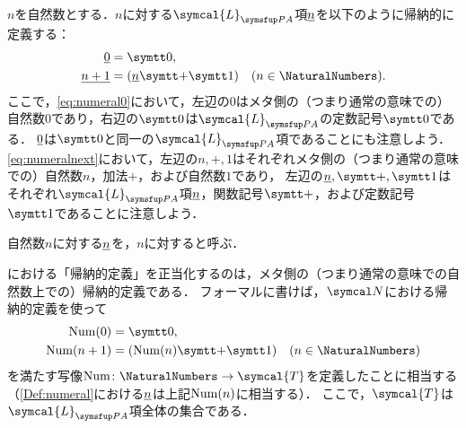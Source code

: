 \begin{Def} \label{Def:numeral}
	\(n\)を自然数とする．\(n\)に対する\(\symcal{L}_{\PA}\)項\(\underline{n}\)を以下のように帰納的に定義する：
	\begin{align}
		\numeral{0}     & = \obj{0},
		\label{eq:numeral0}                                                                    \\
		\numeral{n + 1} & = \paren{\numeral{n} \obj{+} \obj{1}} \quad (n \in \NaturalNumbers).
		\label{eq:numeralnext}
	\end{align}
	ここで，\cref{eq:numeral0}において，左辺の\(0\)はメタ側の（つまり通常の意味での）自然数\(0\)であり，右辺の\(\obj{0}\)は\(\symcal{L}_{\PA}\)の定数記号\(\obj{0}\)である．
	\(\underline{0}\)は\(\obj{0}\)と同一の\(\symcal{L}_{\PA}\)項であることにも注意しよう．
	\cref{eq:numeralnext}において，左辺の\(n, \mathord{+}, 1\)はそれぞれメタ側の（つまり通常の意味での）自然数\(n\)，加法\(+\)，および自然数\(1\)であり，
	左辺の\(\numeral{n}, \obj{+}, \obj{1}\)はそれぞれ\(\symcal{L}_{\PA}\)項\(\underline{n}\)，関数記号\(\obj{+}\)，および定数記号\(\obj{1}\)であることに注意しよう．

	自然数\(n\)に対する\(\underline{n}\)を，\(n\)に対すると呼ぶ．
\end{Def}

\begin{Note}
	における「帰納的定義」を正当化するのは，メタ側の（つまり通常の意味での自然数上での）帰納的定義である．
	フォーマルに書けば，\(\standardmodel\)における帰納的定義を使って
	\begin{align*}
		\apply{\Num}{0}      & = \obj{0},                                                              \\
		\apply{\Num}{n  + 1} & = \paren{\apply{\Num}{n} \obj{+} \obj{1}} \quad (n \in \NaturalNumbers)
	\end{align*}
	を満たす写像\(\Num \colon \NaturalNumbers \to \symcal{T}\)を定義したことに相当する（\cref{Def:numeral}における\(\underline{n}\)は上記\(\apply{\Num}{n}\)に相当する）．
	ここで，\(\symcal{T}\)は\(\symcal{L}_{\PA}\)項全体の集合である．
\end{Note}


